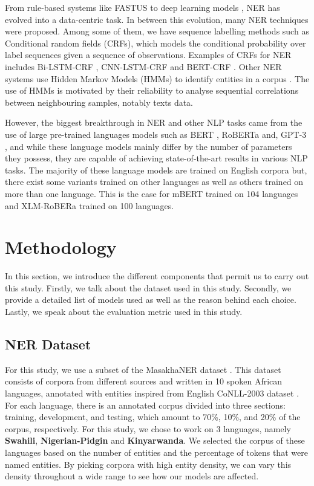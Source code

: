 \documentclass{article}
\begin{document}
From rule-based systems like FASTUS \cite{appelt-etal-1995-sri} to deep learning models \cite{abs-1812-09449}, NER has evolved into a data-centric task. In between this evolution, many NER techniques were proposed. Among some of them, we have sequence labelling methods such as Conditional random fields (CRFs), which models the conditional probability over label sequences given a sequence of observations. Examples of CRFs for NER includes Bi-LSTM-CRF \cite{HuangXY15}, CNN-LSTM-CRF \cite{abs-1905-01964} and BERT-CRF \cite{abs-1909-10649}. Other NER systems use Hidden Markov Models (HMMs) to identify entities in a corpus \cite{10.1007/978-3-540-77046-6_67}. The use of HMMs is motivated by their reliability to analyse sequential correlations between neighbouring samples, notably texts data.

However, the biggest breakthrough in NER and other NLP tasks came from the use of large pre-trained languages models such as BERT  \cite{abs-1810-04805}, RoBERTa \cite{abs-1907-11692} and, GPT-3 \cite{abs-2005-14165}, and while these language models mainly differ by the number of parameters they possess, they are capable of achieving state-of-the-art results in various NLP tasks. The majority of these language models are trained on English corpora but, there exist some variants trained on other languages \cite{abs-1911-03894, abs-2012-02110, CaneteCFP2020} as well as others trained on more than one language. This is the case for mBERT \cite{abs-1911-03310} trained on 104 languages and XLM-RoBERa \cite{abs-1901-07291} trained on 100 languages.

\section{Methodology}
\label{sec:met}

In this section, we introduce the different components that permit us to carry out this study. Firstly, we talk about the dataset used in this study. Secondly, we provide a detailed list of models used as well as the reason behind each choice. Lastly, we speak about the evaluation metric used in this study.

\subsection{NER Dataset}

For this study, we use a subset of the MasakhaNER dataset \cite{10.1162/tacl_a_00416}. This dataset consists of corpora from different sources and written in 10 spoken African languages, annotated with entities inspired from English CoNLL-2003 dataset \cite{tjong-kim-sang-2002-introduction}. For each language, there is an annotated corpus divided into three sections: training, development, and testing, which amount to 70\%, 10\%, and 20\% of the corpus, respectively. For this study, we chose to work on 3 languages, namely \textbf{Swahili}, \textbf{Nigerian-Pidgin} and \textbf{Kinyarwanda}. We selected the corpus of these languages based on the number of entities and the percentage of tokens that were named entities. By picking corpora with high entity density, we can vary this density throughout a wide range to see how our models are affected.
\end{document}
